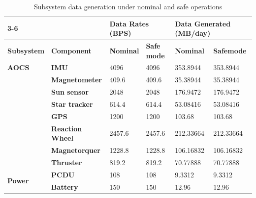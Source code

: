 \documentclass[a4paper, 11pt, conference]{IEEEtran}
\begin{document}
\begin{table}[H]
\centering
\caption{Subsystem data generation under nominal and safe operations}
\label{tab:data_budget_nominal_orig}

\begin{sideways}
\footnotesize
\setlength{\tabcolsep}{4pt}
\begin{tabular}{ll|ll|ll|}
\cline{3-6}
\textbf{} & \textbf{} & \multicolumn{2}{l|}{\textbf{Data Rates (BPS)}} & \multicolumn{2}{l|}{\textbf{Data Generated (MB/day)}} \\ \hline
\multicolumn{1}{|l|}{\textbf{Subsystem}} & \textbf{Component} & \multicolumn{1}{l|}{\textbf{Nominal}} & \textbf{Safe mode} & \multicolumn{1}{l|}{\textbf{Nominal}} & \textbf{Safemode} \\ \hline

\multicolumn{1}{|l|}{\textbf{AOCS}} & \textbf{IMU} & \multicolumn{1}{l|}{4096} & 4096 & \multicolumn{1}{l|}{353.8944} & 353.8944 \\
\multicolumn{1}{|l|}{} & \textbf{Magnetometer} & \multicolumn{1}{l|}{409.6} & 409.6 & \multicolumn{1}{l|}{35.38944} & 35.38944 \\
\multicolumn{1}{|l|}{} & \textbf{Sun sensor} & \multicolumn{1}{l|}{2048} & 2048 & \multicolumn{1}{l|}{176.9472} & 176.9472 \\
\multicolumn{1}{|l|}{} & \textbf{Star tracker} & \multicolumn{1}{l|}{614.4} & 614.4 & \multicolumn{1}{l|}{53.08416} & 53.08416 \\
\multicolumn{1}{|l|}{} & \textbf{GPS} & \multicolumn{1}{l|}{1200} & 1200 & \multicolumn{1}{l|}{103.68} & 103.68 \\
\multicolumn{1}{|l|}{} & \textbf{Reaction Wheel} & \multicolumn{1}{l|}{2457.6} & 2457.6 & \multicolumn{1}{l|}{212.33664} & 212.33664 \\
\multicolumn{1}{|l|}{} & \textbf{Magnetorquer} & \multicolumn{1}{l|}{1228.8} & 1228.8 & \multicolumn{1}{l|}{106.16832} & 106.16832 \\
\multicolumn{1}{|l|}{} & \textbf{Thruster} & \multicolumn{1}{l|}{819.2} & 819.2 & \multicolumn{1}{l|}{70.77888} & 70.77888 \\

\multicolumn{1}{|l|}{\multirow{2}{*}{\textbf{Power}}} & \textbf{PCDU} & \multicolumn{1}{l|}{108} & 108 & \multicolumn{1}{l|}{9.3312} & 9.3312 \\
\multicolumn{1}{|l|}{} & \textbf{Battery} & \multicolumn{1}{l|}{150} & 150 & \multicolumn{1}{l|}{12.96} & 12.96 \\


\end{tabular}
\end{sideways}
\end{table}
\end{document}
